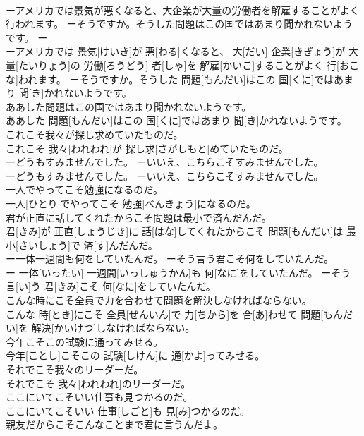 \documentclass[8pt]{extreport}
\begin{document}
\begin{CJK}{UTF8}{min}
\\	ーアメリカでは景気が悪くなると、大企業が大量の労働者を解雇することがよく行われます。 ーそうですか。そうした問題はこの国ではあまり聞かれないようです。	ー
\\	ーアメリカでは 景気[けいき]が 悪[わる]くなると、 大[だい] 企業[きぎょう]が 大量[たいりょう]の 労働[ろうどう] 者[しゃ]を 解雇[かいこ]することがよく 行[おこな]われます。 ーそうですか。そうした 問題[もんだい]はこの 国[くに]ではあまり 聞[き]かれないようです。
\\	ああした問題はこの国ではあまり聞かれないようです。	
\\	ああした 問題[もんだい]はこの 国[くに]ではあまり 聞[き]かれないようです。
\\	これこそ我々が探し求めていたものだ。	
\\	これこそ 我々[われわれ]が 探し求[さがしもと]めていたものだ。
\\	ーどうもすみませんでした。 ーいいえ、こちらこそすみませんでした。	
\\	ーどうもすみませんでした。 ーいいえ、こちらこそすみませんでした。
\\	一人でやってこそ勉強になるのだ。	
\\	一人[ひとり]でやってこそ 勉強[べんきょう]になるのだ。
\\	君が正直に話してくれたからこそ問題は最小で済んだんだ。	
\\	君[きみ]が 正直[しょうじき]に 話[はな]してくれたからこそ 問題[もんだい]は 最小[さいしょう]で 済[す]んだんだ。
\\	ー一体一週間も何をしていたんだ。 ーそう言う君こそ何をしていたんだ。	
\\	ー 一体[いったい] 一週間[いっしゅうかん]も 何[なに]をしていたんだ。 ーそう 言[い]う 君[きみ]こそ 何[なに]をしていたんだ。
\\	こんな時にこそ全員で力を合わせて問題を解決しなければならない。	
\\	こんな 時[とき]にこそ 全員[ぜんいん]で 力[ちから]を 合[あ]わせて 問題[もんだい]を 解決[かいけつ]しなければならない。
\\	今年こそこの試験に通ってみせる。	
\\	今年[ことし]こそこの 試験[しけん]に 通[かよ]ってみせる。
\\	それでこそ我々のリーダーだ。	
\\	それでこそ 我々[われわれ]のリーダーだ。
\\	ここにいてこそいい仕事も見つかるのだ。	
\\	ここにいてこそいい 仕事[しごと]も 見[み]つかるのだ。
\\	親友だからこそこんなことまで君に言うんだよ。	

\end{CJK}
\end{document}
